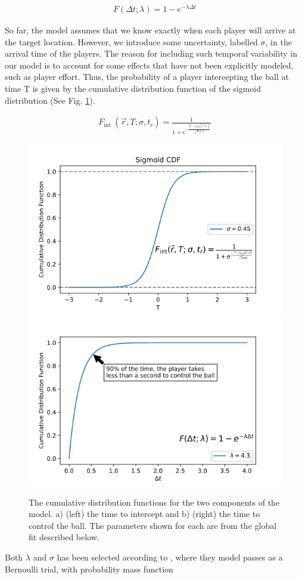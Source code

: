 \documentclass[
  twoside,nohyper]{book}
\begin{document}
\begin{align}
F(\Delta t ; \lambda)=1-e^{-\lambda \Delta t}
\end{align}

So far, the model assumes that we know exactly when each player will arrive at the target location. However, we introduce some uncertainty, labelled \(\sigma\), in the arrival time of the players. The reason for including such temporal variability in our model is to account for some effects that have not been explicitly modeled, such as player effort. Thus, the probability of a player intercepting the ball at time T is given by the cumulative distribution function of the sigmoid distribution (See Fig. \ref{fig:lambda}).

\begin{align}
    F_{\text {int }}(\vec{r},T;\sigma, t_r)=\frac{1}{1+e^{-\frac{T- \tau_{exp}(\vec{r} ; t_r)}{\sqrt{3} \sigma / \pi}}}
    \label{sigmoid}
\end{align}

\begin{figure}[H]

{\centering \includegraphics[width=0.45\linewidth,]{imagenes/sigmoid_poster} \includegraphics[width=0.45\linewidth,]{imagenes/exp_poster} 

}

\caption{The cumulative distribution functions for the two components of the model. a) (left) the time to intercept and b) (right) the time to control the ball.    The parameters shown for each are from the global fit described below.}\label{fig:lambda}
\end{figure}

Both \(\lambda\) and \(\sigma\) has been selected according to \citep{SpearmanFit}, where they model passes as a Bernoulli trial, with probability mass function
\end{document}

